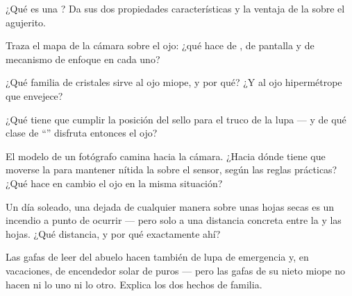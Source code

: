 \begin{exercise}[$\star$]\label{exo:g8:lenses-images:5}
¿Qué es una ? Da sus dos propiedades características y
la ventaja de la  sobre el agujerito.
\end{exercise}

\begin{exercise}[$\star$]\label{exo:g8:lenses-images:6}
Traza el mapa de la cámara sobre el ojo: ¿qué hace de , de
pantalla y de mecanismo de enfoque en cada uno?
\end{exercise}

\begin{exercise}[$\star$]\label{exo:g8:lenses-images:7}
¿Qué familia de cristales sirve al ojo miope, y por qué? ¿Y al ojo
hipermétrope que envejece?
\end{exercise}

\begin{exercise}[$\star$]\label{exo:g8:lenses-images:8}
¿Qué tiene que cumplir la posición del sello para el truco de la lupa
--- y de qué clase de ``'' disfruta entonces el ojo?
\end{exercise}

\begin{exercise}[$\star\star$]\label{exo:g8:lenses-images:9}
El modelo de un fotógrafo camina hacia la cámara. ¿Hacia dónde tiene
que moverse la  para mantener nítida la  sobre
el sensor, según las reglas prácticas? ¿Qué hace en cambio el ojo en la
misma situación?
\end{exercise}

\begin{exercise}[$\star\star$]\label{exo:g8:lenses-images:10}
Un día soleado, una  dejada de cualquier manera sobre unas
hojas secas es un incendio a punto de ocurrir --- pero solo a una
distancia concreta entre la  y las hojas. ¿Qué distancia, y por
qué exactamente ahí?
\end{exercise}

\begin{exercise}[$\star\star$]\label{exo:g8:lenses-images:11}
Las gafas de leer del abuelo hacen también de lupa de emergencia y, en
vacaciones, de encendedor solar de puros --- pero las gafas de su nieto
miope no hacen ni lo uno ni lo otro. Explica los dos hechos de familia.
\end{exercise}

